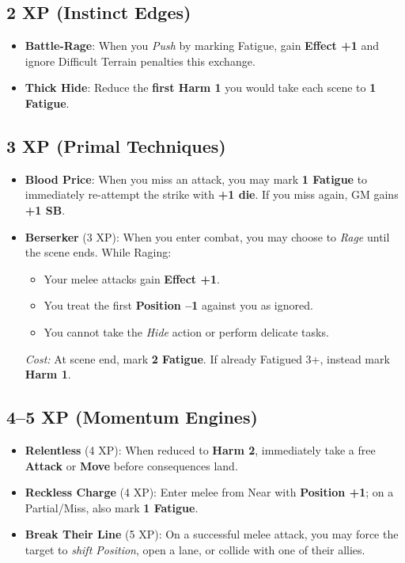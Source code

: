 \documentclass[11pt]{book}
\begin{document}
\subsection*{2 XP (Instinct Edges)}
\begin{itemize}
  \item \textbf{Battle-Rage}: When you \emph{Push} by marking Fatigue, gain \textbf{Effect +1}
    and ignore Difficult Terrain penalties this exchange.
  \item \textbf{Thick Hide}: Reduce the \textbf{first Harm 1} you would take each scene to
    \textbf{1 Fatigue}.
\end{itemize}

\subsection*{3 XP (Primal Techniques)}
\begin{itemize}
  \item \textbf{Blood Price}: When you miss an attack, you may mark \textbf{1 Fatigue} to
    immediately re-attempt the strike with \textbf{+1 die}. If you miss again, GM gains
    \textbf{+1 SB}.
  \item \textbf{Berserker} (3 XP):  
    When you enter combat, you may choose to \emph{Rage} until the scene ends.  
    While Raging:
    \begin{itemize}
      \item Your melee attacks gain \textbf{Effect +1}.  
      \item You treat the first \textbf{Position --1} against you as ignored.  
      \item You cannot take the \emph{Hide} action or perform delicate tasks.  
    \end{itemize}
    \textit{Cost:} At scene end, mark \textbf{2 Fatigue}. If already Fatigued 3+, instead mark
    \textbf{Harm 1}.
\end{itemize}

\subsection*{4--5 XP (Momentum Engines)}
\begin{itemize}
  \item \textbf{Relentless} (4 XP): When reduced to \textbf{Harm 2}, immediately take a free
    \textbf{Attack} or \textbf{Move} before consequences land.
  \item \textbf{Reckless Charge} (4 XP): Enter melee from Near with \textbf{Position +1}; on a
    Partial/Miss, also mark \textbf{1 Fatigue}.
  \item \textbf{Break Their Line} (5 XP): On a successful melee attack, you may force the
    target to \emph{shift Position}, open a lane, or collide with one of their allies.
\end{itemize}
\end{document}

